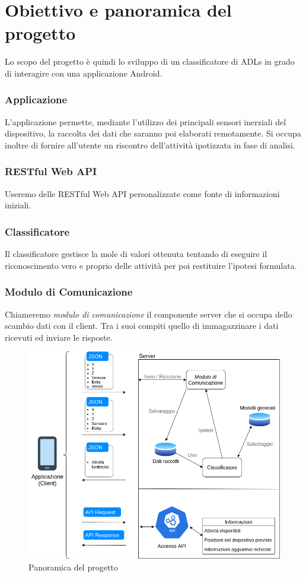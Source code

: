\section{Obiettivo e panoramica del progetto}
Lo scopo del progetto è quindi lo sviluppo di un classificatore di ADLs in grado di interagire con una applicazione
Android.

\subsubsection{Applicazione}
L'applicazione permette, mediante l'utilizzo dei principali sensori inerziali del dispositivo, la raccolta dei dati che saranno poi elaborati 
remotamente. Si occupa inoltre di fornire all'utente un riscontro dell'attività ipotizzata in fase di analisi.
\subsubsection{RESTful Web API}
Useremo delle RESTful Web API personalizzate come fonte di informazioni iniziali.
\subsubsection{Classificatore}
Il classificatore gestisce la mole di valori ottenuta 
tentando di eseguire il riconoscimento vero e proprio delle attività 
per poi restituire l'ipotesi formulata.
\subsubsection{Modulo di Comunicazione}
Chiameremo \textit{modulo di comunicazione} il componente server che si occupa dello scambio dati con il client.
Tra i suoi compiti quello di immagazzinare i dati ricevuti ed inviare le risposte.


\vfill
\begin{figure}[H]
    \centering
    \includegraphics[scale = 0.56]{assets/images/overview.png}
    \caption{Panoramica del progetto}
    \label{fig:overview}
\end{figure}